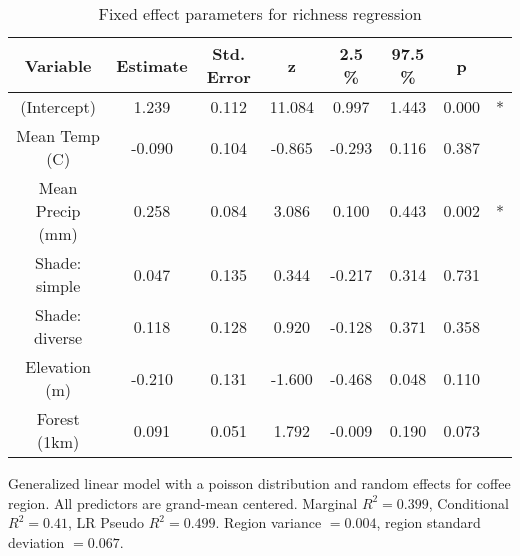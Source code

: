 \begin{table}[!h]
\centering
\caption{\label{tab:lmer_richness_fixed}Fixed effect parameters for richness regression}
\centering
\fontsize{9}{11}\selectfont
\begin{threeparttable}
\begin{tabular}[t]{cccccccc}
\hline\hline
Variable & Estimate & Std. Error & z & 2.5 \% & 97.5 \% & p &  \\
\midrule
(Intercept) & 1.239 & 0.112 & 11.084 & 0.997 & 1.443 & 0.000 & *\\
Mean Temp (C) & -0.090 & 0.104 & -0.865 & -0.293 & 0.116 & 0.387 & \\
Mean Precip (mm) & 0.258 & 0.084 & 3.086 & 0.100 & 0.443 & 0.002 & *\\
Shade: simple & 0.047 & 0.135 & 0.344 & -0.217 & 0.314 & 0.731 & \\
Shade: diverse & 0.118 & 0.128 & 0.920 & -0.128 & 0.371 & 0.358 & \\
Elevation (m) & -0.210 & 0.131 & -1.600 & -0.468 & 0.048 & 0.110 & \\
Forest (1km) & 0.091 & 0.051 & 1.792 & -0.009 & 0.190 & 0.073 & \\
\hline\hline
\end{tabular}
\begin{tablenotes}[para]
\item Generalized linear model with a poisson distribution and random effects for coffee region. All predictors are grand-mean centered.  Marginal $R^2 =  0.399 $,  Conditional $R^2 =  0.41 $,  LR Pseudo $R^2 =  0.499 $. Region variance $ =  0.004 $, region standard deviation $ =  0.067 $.
\end{tablenotes}
\end{threeparttable}
\end{table}

